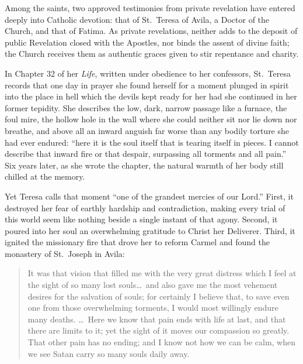 Among the saints, two approved testimonies from private revelation have entered deeply into Catholic devotion: that of St.\ Teresa of Avila, a Doctor of the Church, and that of Fatima. As private revelations, neither adds to the deposit of public Revelation closed with the Apostles, nor binds the assent of divine faith; the Church receives them as authentic graces given to stir repentance and charity.

In Chapter 32 of her \textit{Life}, written under obedience to her confessors, St.\ Teresa records that one day in prayer she found herself for a moment plunged in spirit into the place in hell which the devils kept ready for her had she continued in her former tepidity. She describes the low, dark, narrow passage like a furnace, the foul mire, the hollow hole in the wall where she could neither sit nor lie down nor breathe, and above all an inward anguish far worse than any bodily torture she had ever endured: ``here it is the soul itself that is tearing itself in pieces. I cannot describe that inward fire or that despair, surpassing all torments and all pain.'' Six years later, as she wrote the chapter, the natural warmth of her body still chilled at the memory.

Yet Teresa calls that moment ``one of the grandest mercies of our Lord.'' First, it destroyed her fear of earthly hardship and contradiction, making every trial of this world seem like nothing beside a single instant of that agony. Second, it poured into her soul an overwhelming gratitude to Christ her Deliverer. Third, it ignited the missionary fire that drove her to reform Carmel and found the monastery of St.\ Joseph in Avila:

\begin{quote}
It was that vision that filled me with the very great distress which I feel at the sight of so many lost souls\dots\ and also gave me the most vehement desires for the salvation of souls; for certainly I believe that, to save even one from those overwhelming torments, I would most willingly endure many deaths. \dots\ Here we know that pain ends with life at last, and that there are limits to it; yet the sight of it moves our compassion so greatly. That other pain has no ending; and I know not how we can be calm, when we see Satan carry so many souls daily away.
\end{quote}

